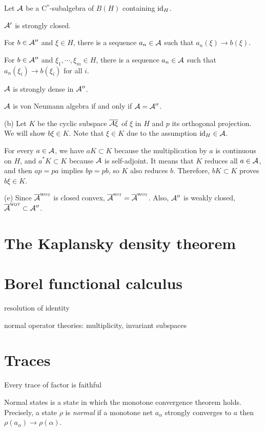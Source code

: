 \documentclass{../note}
\newcommand{\wot}{{\text{\sc wot}}}
\newcommand{\sot}{{\text{\sc sot}}}
\begin{document}
\begin{thm}
Let $\mathcal{A}$ be a C$^*$-subalgebra of $B(H)$ containing $\operatorname{id}_H$.
\begin{parts}
\item $\mathcal{A}'$ is strongly closed.
\item For $b\in\mathcal{A}''$ and $\xi\in H$, there is a sequence $a_n\in\mathcal{A}$ such that $a_n(\xi)\to b(\xi)$.
\item For $b\in\mathcal{A}''$ and $\xi_1,\cdots,\xi_m\in H$, there is a sequence $a_n\in\mathcal{A}$ such that $a_n(\xi_i)\to b(\xi_i)$ for all $i$.
\item $\mathcal{A}$ is strongly dense in $\mathcal{A}''$.
\item $\mathcal{A}$ is von Neumann algebra if and only if $\mathcal{A}=\mathcal{A}''$.
\end{parts}
\end{thm}
\begin{pf}
(b)
Let $K$ be the cyclic subspace $\overline{\mathcal{A}\xi}$ of $\xi$ in $H$ and $p$ its orthogonal projection.
We will show $b\xi\in K$.
Note that $\xi\in K$ due to the assumption $\operatorname{id}_H\in\mathcal{A}$.

For every $a\in\mathcal{A}$, we have $aK\subset K$ because the multiplication by $a$ is continuous on $H$, and $a^*K\subset K$ because $\mathcal{A}$ is self-adjoint.
It means that $K$ reduces all $a\in\mathcal{A}$, and then $ap=pa$ implies $bp=pb$, so $K$ also reduces $b$.
Therefore, $bK\subset K$ proves $b\xi\in K$.

(e)
Since $\bar\cA^\wot$ is closed convex, $\bar\cA^\sot=\bar\cA^\wot$.
Also, $\mathcal{A}''$ is weakly closed, $\bar\cA^\wot\subset\cA''$.
\end{pf}


\section{The Kaplansky density theorem}

\section{Borel functional calculus}
resolution of identity

normal operator theories: multiplicity, invariant subspaces

\section{Traces}
Every trace of factor is faithful


\begin{prb}
Normal states is a state in which the monotone convergence theorem holds.
Precisely, a state $\rho$ is \emph{normal} if a monotone net $a_\alpha$ strongly converges to $a$ then $\rho(a_\alpha)\to\rho(\alpha)$.
\end{prb}
\end{document}
